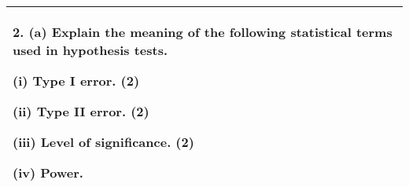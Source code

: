 \documentclass[a4paper,12pt]{article}
\begin{document}
\begin{table}[ht!]
 
\centering
 
\begin{tabular}{|p{15cm}|}
 
\hline  


2. (a) Explain the meaning of the following statistical terms used in hypothesis tests. 
 
(i) Type I error. 
(2) 
 
 (ii) Type II error. 
(2) 
 
 (iii) Level of significance. 
(2) 
 
 (iv) Power. 
\\ \hline
  
\end{tabular}

\end{table}
\end{document}
